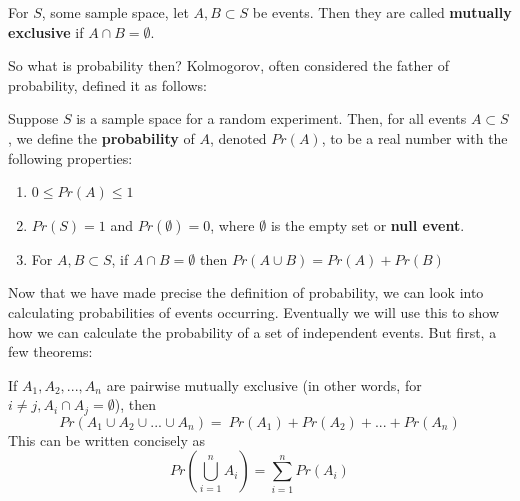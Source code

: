 \begin{defn}
For $S$, some sample space, let $A, B \subset S$ be events. Then they are
called \textbf{mutually exclusive} if $A \cap B = \emptyset$.
\end{defn}

So what is probability then? Kolmogorov, often considered the father of
probability, defined it as follows: 

\begin{defn}
Suppose $S$ is a sample space for a random experiment. Then, for all events $A
\subset S$, we define the \textbf{probability} of $A$, denoted $Pr(A)$, to be a
real number with the following properties:
\begin{enumerate}
\item $0 \leq Pr(A) \leq 1$
\item $Pr(S) = 1$ and $Pr(\emptyset) = 0$, where $\emptyset$ is the empty set or \textbf{null event}.
\item For $A, B \subset S$, if $A \cap B = \emptyset$ then $Pr(A \cup B) = Pr(A) + Pr(B)$
\end{enumerate}
\end{defn}

Now that we have made precise the definition of probability, we can look
into calculating probabilities of events occurring. Eventually we will
use this to show how we can calculate the probability of a set of 
independent events. But first, a few theorems:

\begin{thm}
If $A_1, A_2, ... ,A_n$ are pairwise mutually
exclusive (in other words, for $i \neq j, A_i \cap A_j = \emptyset$), then
\begin{equation}
    Pr(A_1 \cup A_2 \cup ... \cup A_n) = \
    Pr(A_1) + Pr(A_2) + ... + Pr(A_n)
\end{equation}
This can be written concisely as
\begin{equation}
    Pr\left(\bigcup _{i=1}^nA_i\right) = \sum _{i=1}^nPr(A_i) 
\end{equation}
\end{thm}

